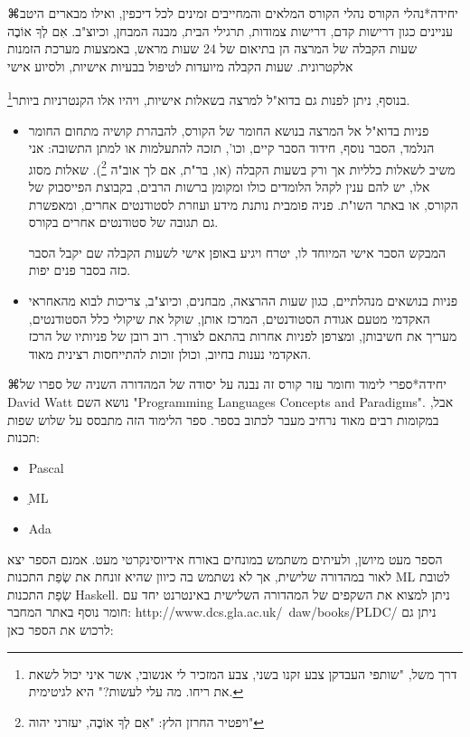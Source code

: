 ⌘יחידה*{נהלי הקורס} 
      נהלי הקורס המלאים והמחייבים זמינים לכל דיכפין, ואילו מבארים היטב עניינים כגון דרישות קדם, דרישות צמודות, תרגילי הבית, מבנה המבחן, וכיוצ"ב.
      אִם לְךָ אוֹבֶה
      שעות הקבלה של המרצה הן בתיאום של 24 שעות מראש, באמצעות מערכת הזמנות אלקטרונית. שעות הקבלה מיועדות לטיפול בבעיות אישיות, ולסיוע אישי

      בנוסף, ניתן לפנות גם בדוא"ל למרצה בשאלות אישיות, ויהיו אלו הקנטרניות ביותר\footnote{דרך משל,  "שותפי העבדקן צבע זקנו בשני, צבע המזכיר לי אנשובי, אשר איני יכול לשאת את ריחו. מה עלי לעשות?" היא לגיטימית.}.
      \begin{itemize}

     \item 
      פניות בדוא"ל אל המרצה בנושא החומר של הקורס, להבהרת קושיה מתחום החומר הנלמד, הסבר נוסף, חידוד הסבר קיים, וכו', תזכה להתעלמות או למתן התשובה: אני משיב לשאלות כלליות אך ורק בשעות הקבלה (או, בר"ת, אם לך אוב"ה \footnote{ ויפטיר החרזן הלץ: "אִם לְךָ אוֹבֶה, יעזרני יהוה"}). שאלות מסוג אלו, יש להם ענין לקהל הלומדים כולו ומקומן ברשות הרבים,  בקבוצת הפייסבוק של הקורס, או באתר השו"ת.  פניה פומבית נותנת מידע ועוזרת לסטודנטים אחרים, ומאפשרת גם תגובה של סטודנטים אחרים בקורס. 
      
      המבקש הסבר אישי המיוחד לו, יטרח ויגיע באופן אישי לשעות הקבלה שם יקבל הסבר כזה בסבר פנים יפות.
    \item 
     פניות בנושאים מנהלתיים, כגון שעות ההרצאה, מבחנים, וכיוצ"ב, צריכות לבוא מהאחראי האקדמי מטעם אגודת הסטודנטים, המרכז אותן, שוקל את שיקולי כלל הסטודנטים, מעריך את חשיבותן, ומצרפן לפניות אחרות בהתאם לצורך. רוב רובן של פניותיו של הרכז האקדמי נענות בחיוב, וכולן זוכות להתייחסות רצינית מאוד.
\end{itemize}
⌘יחידה*{ספרי לימוד וחומר עזר}
      קורס זה נבנה על יסודה של המהדורה השניה של ספרו של David Watt נושא השם "Programming Languages Concepts and Paradigms". אבל, במקומות רבים מאוד נרחיב מעבר לכתוב בספר. ספר הלימוד הזה מתבסס על שלוש שפות תכנות:
      \begin{itemize}
      \item Pascal
      \item ֵML
      \item Ada
     \end{itemize} 
      הספר מעט מיושן, ולעיתים משתמש במונחים באורח אידיוסינקרטי מעט. אמנם הספר יצא לאור במהדורה שלישית, אך לא נשתמש בה כיוון שהיא זונחת את שְׂפַת התכנות ML לטובת שְׂפַת התכנות Haskell.
      ניתן למצוא את השקפים של המהדורה השלישית באינטרנט יחד עם חומר נוסף באתר המחבר:
      http://www.dcs.gla.ac.uk/~daw/books/PLDC/
      ניתן גם לרכוש את הספר כאן:


